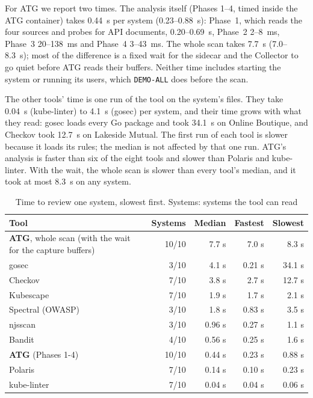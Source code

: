 \documentclass[conference]{IEEEtran}
\begin{document}
For ATG we report two times. The analysis itself (Phases 1--4, timed inside the ATG container) takes 0.44~s per system (0.23--0.88~s): Phase~1, which reads the four sources and probes for API documents, 0.20--0.69~s, Phase~2 2--8~ms, Phase~3 20--138~ms and Phase~4 3--43~ms. The whole scan takes 7.7~s (7.0--8.3~s); most of the difference is a fixed wait for the sidecar and the Collector to go quiet before ATG reads their buffers. Neither time includes starting the system or running its users, which \texttt{DEMO-ALL} does before the scan.

The other tools' time is one run of the tool on the system's files. They take 0.04~s (kube-linter) to 4.1~s (gosec) per system, and their time grows with what they read: gosec loads every Go package and took 34.1~s on Online Boutique, and Checkov took 12.7~s on Lakeside Mutual. The first run of each tool is slower because it loads its rules; the median is not affected by that one run. ATG's analysis is faster than six of the eight tools and slower than Polaris and kube-linter. With the wait, the whole scan is slower than every tool's median, and it took at most 8.3~s on any system.

\begin{table}[!htbp]
\caption{Time to review one system, slowest first. Systems: systems the tool can read}
\label{tab:speed}
\centering
\footnotesize
\setlength{\tabcolsep}{3pt}
\begin{tabular}{@{}>{\raggedright\arraybackslash}p{3.3cm}rrrr@{}}
\toprule
Tool & Systems & Median & Fastest & Slowest \\
\midrule
\textbf{ATG}, whole scan (with the wait for the capture buffers) & 10/10 & 7.7 s & 7.0 s & 8.3 s \\
gosec & 3/10 & 4.1 s & 0.21 s & 34.1 s \\
Checkov & 7/10 & 3.8 s & 2.7 s & 12.7 s \\
Kubescape & 7/10 & 1.9 s & 1.7 s & 2.1 s \\
Spectral (OWASP) & 3/10 & 1.8 s & 0.83 s & 3.5 s \\
njsscan & 3/10 & 0.96 s & 0.27 s & 1.1 s \\
Bandit & 4/10 & 0.56 s & 0.25 s & 1.6 s \\
\textbf{ATG} (Phases 1-4) & 10/10 & 0.44 s & 0.23 s & 0.88 s \\
Polaris & 7/10 & 0.14 s & 0.10 s & 0.23 s \\
kube-linter & 7/10 & 0.04 s & 0.04 s & 0.06 s \\
\bottomrule
\end{tabular}
\end{table}
\end{document}
